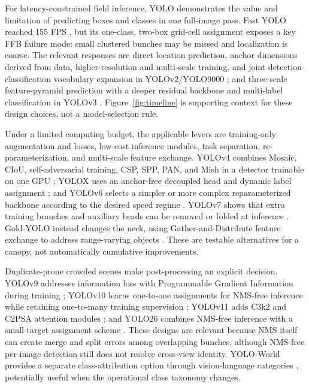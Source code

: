For latency-constrained field inference, YOLO demonstrates the value and limitation of predicting boxes and classes in one full-image pass. Fast YOLO reached 155 FPS \cite{redmon2016yolo}, but its one-class, two-box grid-cell assignment exposes a key FFB failure mode: small clustered bunches may be missed and localization is coarse. The relevant responses are direct location prediction, anchor dimensions derived from data, higher-resolution and multi-scale training, and joint detection-classification vocabulary expansion in YOLOv2/YOLO9000 \cite{redmon2017yolo9000}; and three-scale feature-pyramid prediction with a deeper residual backbone and multi-label classification in YOLOv3 \cite{redmon2018yolov3}. Figure~\ref{fig:timeline} is supporting context for these design choices, not a model-selection rule.

Under a limited computing budget, the applicable levers are training-only augmentation and losses, low-cost inference modules, task separation, re-parameterization, and multi-scale feature exchange. YOLOv4 combines Mosaic, CIoU, self-adversarial training, CSP, SPP, PAN, and Mish in a detector trainable on one GPU \cite{bochkovskiy2020yolov4}; YOLOX uses an anchor-free decoupled head and dynamic label assignment \cite{ge2021yolox}; and YOLOv6 selects a simpler or more complex reparameterized backbone according to the desired speed regime \cite{li2022yolov6}. YOLOv7 shows that extra training branches and auxiliary heads can be removed or folded at inference \cite{wang2023yolov7}. Gold-YOLO instead changes the neck, using Gather-and-Distribute feature exchange to address range-varying objects \cite{wang2023goldyolo}. These are testable alternatives for a canopy, not automatically cumulative improvements.

Duplicate-prone crowded scenes make post-processing an explicit decision. YOLOv9 addresses information loss with Programmable Gradient Information during training \cite{wang2024yolov9}; YOLOv10 learns one-to-one assignments for NMS-free inference while retaining one-to-many training supervision \cite{wang2024yolov10}; YOLOv11 adds C3k2 and C2PSA attention modules \cite{khanam2024yolov11}; and YOLO26 combines NMS-free inference with a small-target assignment scheme \cite{sapkota2025yolo26}. These designs are relevant because NMS itself can create merge and split errors among overlapping bunches, although NMS-free per-image detection still does not resolve cross-view identity. YOLO-World provides a separate class-attribution option through vision-language categories \cite{cheng2024yoloworld}, potentially useful when the operational class taxonomy changes.

